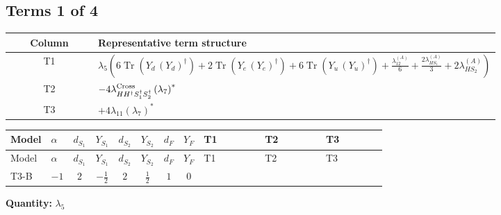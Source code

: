 \documentclass[8pt]{article}
\begin{document}
\begin{landscape}
\subsection*{Terms 1 of 4}
\begin{center}
\begin{tabular}{@{}c >{\raggedright\arraybackslash}p{0.82\linewidth}@{}}
\toprule
Column & Representative term structure \\
\midrule
T1 & \(\displaystyle {\lambda_5} \left(6 \operatorname{Tr}\!\left({Y_d}\,\left({Y_d}\right)^{\dagger}\right)+2 \operatorname{Tr}\!\left({Y_e}\,\left({Y_e}\right)^{\dagger}\right)+6 \operatorname{Tr}\!\left({Y_u}\,\left({Y_u}\right)^{\dagger}\right)+\frac{{\lambda_{12}^{(A)}}}{6}+\frac{2 {\lambda_{HS_1}^{(A)}}}{3}+2 {\lambda_{HS_2}^{(A)}}\right)\) \\
\midrule
T2 & \(\displaystyle -4 {\lambda_{H H^\dagger S_1^\dagger S_2^\dagger}^{\rm Cross}} \left({\lambda_7}\right)^{*}\) \\
\midrule
T3 & \(\displaystyle +4 {\lambda_{11}} \left({\lambda_7}\right)^{*}\) \\
\midrule
\bottomrule
\end{tabular}
\end{center}
\smallskip
\tiny
\begin{longtable}{@{}llcccccc >{\raggedright\arraybackslash}p{0.21\linewidth} >{\raggedright\arraybackslash}p{0.21\linewidth} >{\raggedright\arraybackslash}p{0.21\linewidth}@{}}
\toprule
Model & $\alpha$ & $d_{S_1}$ & $Y_{S_1}$ & $d_{S_2}$ & $Y_{S_2}$ & $d_F$ & $Y_F$ & T1 & T2 & T3 \\
\midrule
\endfirsthead
\toprule
Model & $\alpha$ & $d_{S_1}$ & $Y_{S_1}$ & $d_{S_2}$ & $Y_{S_2}$ & $d_F$ & $Y_F$ & T1 & T2 & T3 \\
\midrule
\endhead
T3-B & $-1$ & $2$ & $-\frac{1}{2}$ & $2$ & $\frac{1}{2}$ & $1$ & $0$ & \scriptsize\adjustbox{max width=\linewidth}{$\begin{gathered} {\lambda_5} \left(6 \operatorname{Tr}\!\left({Y_d}\,\left({Y_d}\right)^{\dagger}\right)+2 \operatorname{Tr}\!\left({Y_e}\,\left({Y_e}\right)^{\dagger}\right)+6 \operatorname{Tr}\!\left({Y_u}\,\left({Y_u}\right)^{\dagger}\right)+\frac{{\lambda_{12}^{(A)}}}{6}+\frac{2 {\lambda_{HS_1}^{(A)}}}{3}+2 {\lambda_{HS_2}^{(A)}}\right)\end{gathered}$} & \scriptsize\adjustbox{max width=\linewidth}{$\begin{gathered} -4 {\lambda_{H H^\dagger S_1^\dagger S_2^\dagger}^{\rm Cross}} \left({\lambda_7}\right)^{*}\end{gathered}$} & \scriptsize\adjustbox{max width=\linewidth}{$\begin{gathered} +4 {\lambda_{11}} \left({\lambda_7}\right)^{*}\end{gathered}$} \\
\midrule
\bottomrule
\end{longtable}
\clearpage
\noindent\textbf{Quantity: }$\lambda_5$\par\smallskip

\end{landscape}
\end{document}
